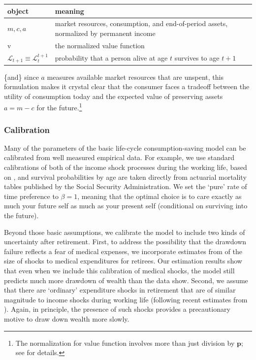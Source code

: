 \documentclass{article}
\newcommand{\pLvl}{\mathbf{p}}
\newcommand{\vFunc}{\mathrm{v}}
\newcommand{\Alive}{\mathcal{L}}
\newcommand{\cNrm}{c}
\newcommand{\aNrm}{a}
\newcommand{\mNrm}{m}
\begin{document}
\bigskip\noindent
\begin{tabular}{p{}p{}}
\toprule
object & meaning \\
\hline
$\mNrm, \cNrm, \aNrm$ & market resources, consumption, and end-of-period assets, normalized by permanent income \\
$\vFunc$ & the normalized value function \\
$\Alive_{t+1} \equiv \Alive_{t}^{t+1}$ & probability that a person alive at age $t$ survives to age $t+1$ \\
\bottomrule
\end{tabular}

\bigskip\{and\} since $\aNrm$ measures available market resources that are unspent, this formulation makes it crystal clear that the consumer faces a tradeoff between the utility of consumption today and the expected value of preserving assets $\aNrm=\mNrm -\cNrm$ for the future.\footnote{The normalization for value function involves more than just division by $\pLvl$; see \cite{BufferStockTheory} for details.}

\subsubsection{Calibration}

Many of the parameters of the basic life-cycle consumption-saving model can be calibrated from well measured empirical data.
For example, we use standard calibrations of both of the income shock processes during the working life, based on \cite{Cagetti2003}, and
survival probabilities by age are taken directly from actuarial mortality tables published by the Social Security Administration.
We set the `pure' rate of time preference to $\beta=1$, meaning that the optimal choice is to care exactly as much your future self as much as your present self (conditional on surviving into the future).

Beyond those basic assumptions, we calibrate the model to include two kinds of uncertainty after retirement.
First, to address the possibility that the drawdown failure reflects a fear of medical expenses, we incorporate estimates from \cite{velasquezgiraldoJMP} of the size of shocks to medical expenditures for retirees.
Our estimation results show that even when we include this calibration of medical shocks, the model still predicts much more drawdown of wealth than the data show.
Second, we assume that there are `ordinary' expenditure shocks in retirement that are of similar magnitude to income shocks during working life (following recent estimates from  \cite{flExpShocks}).
Again, in principle, the presence of such shocks provides a precautionary motive to draw down wealth more slowly.
\end{document}

